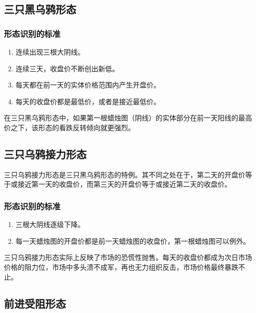 \subsection{三只黑乌鸦形态}
\subsubsection*{形态识别的标准}
\begin{enumerate}
    \item 连续出现三根大阴线。
    \item 连续三天，收盘价不断创出新低。
    \item 每天都在前一天的实体价格范围内产生开盘价。
    \item 每天的收盘价都是最低价，或者是接近最低价。
\end{enumerate}

在三只黑乌鸦形态中，如果第一根蜡烛图（阴线）的实体部分在前一天阳线的最高价之下，该形态的看跌反转倾向就更强烈。
\subsection{三只乌鸦接力形态}
三只乌鸦接力形态是三只黑乌鸦形态的特例。其不同之处在于，第二天的开盘价等于或接近第一天的收盘价，而第三天的开盘价等于或接近第二天的收盘价。
\subsubsection*{形态识别的标准}
\begin{enumerate}
    \item 三根大阴线逐级下降。
    \item 每一天蜡烛图的开盘价都是前一天蜡烛图的收盘价，第一根蜡烛图可以例外。
\end{enumerate}

三只乌鸦接力形态实际上反映了市场的恐慌性抛售。每天的收盘价都成为次日市场价格的阻力位，市场中多头溃不成军，再也无力组织反击，市场价格最终暴跌不止。
\subsection{前进受阻形态}
